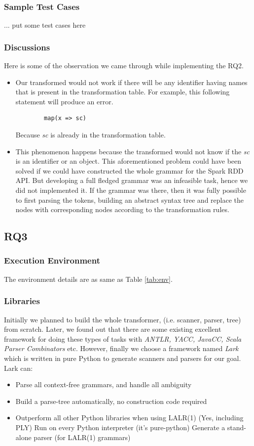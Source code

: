\documentclass[sigplan]{acmart}\settopmatter{printfolios=true,printccs=false,printacmref=false}
\begin{document}
\subsubsection{Sample Test Cases}
... put some test cases here

\subsubsection{Discussions}
Here is some of the observation we came through while implementing the RQ2.
\begin{itemize}
    \item Our transformed would not work if there will be any identifier having names that is present in the transformation table. For example, this following statement will produce an error.
    \begin{lstlisting}
        map(x => sc)
    \end{lstlisting}
    Because \textit{sc} is already in the transformation table.
    \item This phenomenon happens because the transformed would not know if the \textit{sc} is an identifier or an object. This aforementioned problem could have been solved if we could have constructed the whole grammar for the Spark RDD API. But developing a full fledged grammar was an infeasible task, hence we did not implemented it. If the grammar was there, then it was fully possible to first parsing the tokens, building an abstract syntax tree and replace the nodes with corresponding nodes according to the transformation rules. 
\end{itemize}

\subsection{RQ3}
\subsubsection{Execution Environment}
The environment details are as same as Table \ref{tab:env}.

\subsubsection{Libraries}
Initially we planned to build the whole transformer, (i.e. scanner, parser, tree) from scratch. Later, we found out that there are some existing excellent framework for doing these types of tasks with \textit{ANTLR, YACC, JavaCC, Scala Parser Combinators} etc. However, finally we choose a framework named \textit{Lark} which is written in pure Python to generate scanners and parsers for our goal. Lark can:
\begin{itemize}
    \item Parse all context-free grammars, and handle all ambiguity
    \item Build a parse-tree automatically, no construction code required
    \item Outperform all other Python libraries when using LALR(1) (Yes, including PLY)
    Run on every Python interpreter (it's pure-python) Generate a stand-alone parser (for LALR(1) grammars)
\end{itemize}
\end{document}
